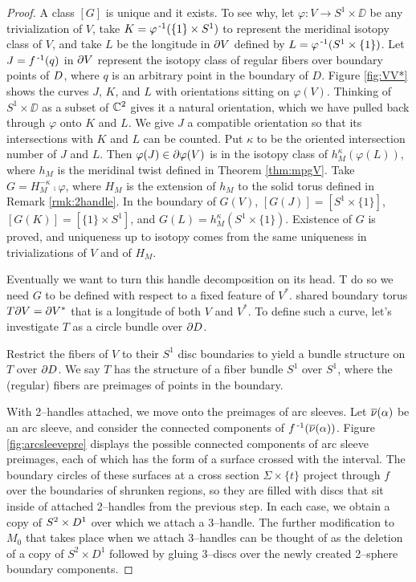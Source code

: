 \begin{proof}
	A class $[G]$ is unique and it exists.
	To see why, let $\varphi:V\to S^1\times\DD$ be any trivialization of $V$, take $K=\varphi^{\,\text{-}1}(\{1\}\times S^1)$ to represent the meridinal isotopy class of $V$, and take $L$ be the longitude in $\partial V$ defined by $L=\varphi^{\,\text{-}1}(S^1\times\{1\})$.
	Let $J=f^{\,\text{-}1}(q)$ in $\partial V$ represent the isotopy class of regular fibers over boundary points of $D$, where $q$ is an arbitrary point in the boundary of $D$.	
	Figure \ref{fig:VV*} shows the curves $J$, $K$, and $L$ with orientations sitting on $\varphi(V)$.
	Thinking of $S^1\times\DD$ as a subset of $\mathbb{C}^2$ gives it a natural orientation, which we have pulled back through $\varphi$ onto $K$ and $L$.
	We give $J$ a compatible orientation so that its intersections with $K$ and $L$ can be counted.
	Put $\kappa$ to be the oriented intersection number of $J$ and $L$.
	Then $\varphi(J)\in \partial\varphi(V)$ is in the isotopy class of $h_M^{\kappa}(\varphi(L))$, where $h_M$ is the meridinal twist defined in Theorem \ref{thm:mpgV}.
	Take $G=H_M^{-\kappa}\comp\varphi$, where $H_M$ is the extension of $h_M$ to the solid torus defined in Remark \ref{rmk:2handle}.
	In the boundary of $G(V)$, $[G(J)]=[S^1\times\{1\}]$, $[G(K)]=[\{1\}\times S^1]$, and $G(L)=h_M^\kappa(S^1\times\{1\})$.
	Existence of $G$ is proved, and uniqueness up to isotopy comes from the same uniqueness in trivializations of $V$ and of $H_M$.
	
	Eventually we want to turn this handle decomposition on its head.
	T do so we need $G$ to be defined with respect to a fixed feature of $V^*$.
		shared boundary torus $T\partial V = \partial V^*$ that is a longitude of both $V$ and $V^*$.
	To define such a curve, let's investigate $T$ as a circle bundle over $\partial D$.
	
	Restrict the fibers of $V$ to their $S^1$ disc boundaries to yield a bundle structure on $T$ over $\partial D$.
	We say $T$ has the structure of a fiber bundle $S^1$ over $S^1$, where the (regular) fibers are preimages of points in the boundary.
	
	
	
	
		
	With 2--handles attached, we move onto the preimages of arc sleeves.
	Let $\overline{\nu}(\alpha)$ be an arc sleeve, and consider the connected components of $f^{\,\text{-}1}(\overline{\nu}(\alpha))$.
	Figure \ref{fig:arcsleevepre} displays the possible connected components of arc sleeve preimages, each of which has the form of a surface crossed with the interval.
	The boundary circles of these surfaces at a cross section $\Sigma\times\{t\}$ project through $f$ over the boundaries of shrunken regions, so they are filled with discs that sit inside of attached 2--handles from the previous step.
	In each case, we obtain a copy of $S^2\times D^1$ over which we attach a 3--handle.
	The further modification to $M_0$ that takes place when we attach 3--handles can be thought of as the deletion of a copy of $S^2\times D^1$ followed by gluing 3--discs over the newly created 2--sphere boundary components.
	

\end{proof}
